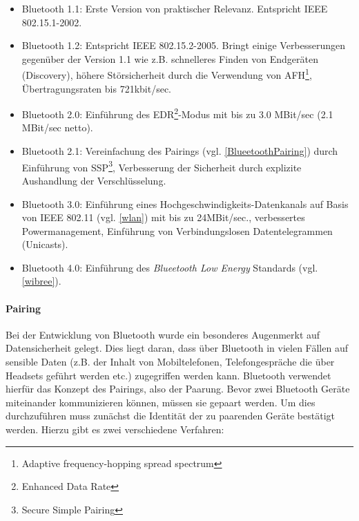                 \begin{itemize}
                    \item{Bluetooth 1.1:} Erste Version von praktischer Relevanz. Entspricht 
                                          IEEE 802.15.1-2002.
                    \item{Bluetooth 1.2:} Entspricht IEEE 802.15.2-2005. Bringt einige Verbesserungen
                                          gegenüber der Version 1.1 wie z.B. schnelleres Finden
                                          von Endgeräten (Discovery), höhere Störsicherheit durch
                                          die Verwendung von AFH\footnote{Adaptive frequency-hopping spread spectrum},
                                          Übertragungsraten bis 721kbit/sec.
                    \item{Bluetooth 2.0:} Einführung des EDR\footnote{Enhanced Data Rate}-Modus mit bis zu
                                          3.0 MBit/sec (2.1 MBit/sec netto).
                    \item{Bluetooth 2.1:} Vereinfachung des Pairings (vgl. \ref{BlueetoothPairing}) durch 
                                          Einführung von SSP\footnote{Secure Simple Pairing}, Verbesserung
                                          der Sicherheit durch explizite Aushandlung der Verschlüsselung.
                    \item{Bluetooth 3.0:} Einführung eines Hochgeschwindigkeits-Datenkanals auf Basis von
                                          IEEE 802.11 (vgl. \ref{wlan}) mit bis zu 24MBit/sec., verbessertes
                                          Powermanagement, Einführung von Verbindungslosen Datentelegrammen
                                          (Unicasts).
                    \item{Bluetooth 4.0:} Einführung des \textsl{Blueetooth Low Energy} Standards (vgl. \ref{wibree}).
                \end{itemize}

            \paragraph{Pairing}\label{BluetoothPairing}
                Bei der Entwicklung von Bluetooth wurde ein besonderes Augenmerkt auf Datensicherheit gelegt. 
                Dies liegt daran, dass über Bluetooth in vielen Fällen auf sensible Daten (z.B. der Inhalt
                von Mobiltelefonen, Telefongespräche die über Headsets geführt werden etc.) zugegriffen
                werden kann. Bluetooth verwendet hierfür das Konzept des Pairings, also der Paarung. Bevor zwei 
                Bluetooth Geräte miteinander kommunizieren können, müssen sie gepaart werden. Um dies 
                durchzuführen muss zunächst die Identität der zu paarenden Geräte bestätigt werden.
                Hierzu gibt es zwei verschiedene Verfahren:


